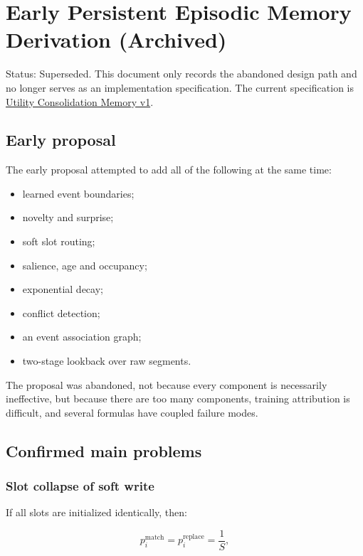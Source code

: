 \section{Early Persistent Episodic Memory Derivation (Archived)}

\begin{notesquote}
Status: Superseded. This document only records the abandoned design path and no longer serves as an implementation specification. The current specification is \href{utility-consolidation-memory-v1.md}{Utility Consolidation Memory v1}.
\end{notesquote}

\subsection{Early proposal}

The early proposal attempted to add all of the following at the same time:

\begin{itemize}
  \item learned event boundaries;
  \item novelty and surprise;
  \item soft slot routing;
  \item salience, age and occupancy;
  \item exponential decay;
  \item conflict detection;
  \item an event association graph;
  \item two-stage lookback over raw segments.
\end{itemize}

The proposal was abandoned, not because every component is necessarily ineffective, but because there are too many components, training attribution is difficult, and several formulas have coupled failure modes.

\subsection{Confirmed main problems}

\subsubsection{Slot collapse of soft write}

If all slots are initialized identically, then:

\[
p_i^{\operatorname{match}}=p_i^{\operatorname{replace}}=\frac1S,
\]

